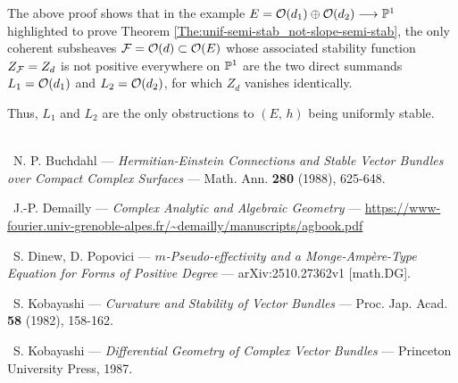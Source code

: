 \documentclass[12pt]{article}
\begin{document}
\vspace{2ex}


\begin{Rem}\label{Rem:example_u-semi-stable_not-stable} The above proof shows that in the example $E={\cal O}(d_1)\oplus{\cal O}(d_2)\longrightarrow\mathbb{P}^1$ highlighted to prove Theorem \ref{The:unif-semi-stab_not-slope-semi-stab}, the only coherent subsheaves ${\cal F} = {\cal O}(d)\subset{\cal O}(E)$ whose associated stability function $Z_{\cal F} = Z_d$ is not positive everywhere on $\mathbb{P}^1$ are the two direct summands $L_1={\cal O}(d_1)$ and $L_2={\cal O}(d_2)$, for which $Z_d$ vanishes identically.

  Thus, $L_1$ and $L_2$ are the only obstructions to $(E,\,h)$ being uniformly stable.


\end{Rem}  


\vspace{6ex}


 \\

\noindent [Buc88]\, N. P. Buchdahl --- {\it Hermitian-Einstein Connections and Stable Vector Bundles over Compact Complex Surfaces} --- Math. Ann. {\bf 280} (1988), 625-648. 

\vspace{1ex}

\noindent [Dem97]\, J.-P. Demailly --- {\it Complex Analytic and Algebraic Geometry} --- \url{https://www-fourier.univ-grenoble-alpes.fr/~demailly/manuscripts/agbook.pdf}

\vspace{1ex}


\noindent [DP25]\, S. Dinew, D. Popovici --- {\it $m$-Pseudo-effectivity and a Monge-Amp\`ere-Type Equation for Forms of Positive Degree} --- arXiv:2510.27362v1 [math.DG].

\vspace{1ex}

\noindent [Kob82]\, S. Kobayashi --- {\it Curvature and Stability of Vector Bundles} --- Proc. Jap. Acad. {\bf 58} (1982), 158-162.

\vspace{1ex}

\noindent [Kob87]\, S. Kobayashi --- {\it Differential Geometry of Complex Vector Bundles} --- Princeton University Press, 1987.
\end{document}
